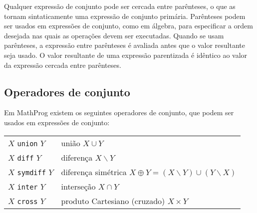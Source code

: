 \documentclass[11pt, brazil]{report}
\begin{document}
Qualquer expressão de conjunto pode ser cercada entre parênteses, o que as tornam
\linebreak sintaticamente uma expressão de conjunto primária.
Parênteses podem ser usados em expressões de conjunto, como em álgebra, para
especificar a ordem desejada nas quais as operações devem ser executadas.
Quando se usam parênteses, a expressão entre parênteses é avaliada
antes que o valor resultante seja usado.
O valor resultante de uma expressão parentizada é idêntico ao valor da expressão
cercada entre parênteses.

%
%

\newpage

\subsection{Operadores de conjunto}

Em MathProg existem os seguintes operadores de conjunto, que podem ser
usados em expressões de conjunto:


\begin{tabular}{@{}ll@{}}
$X$ {\tt union} $Y$&união $X\cup Y$\\
$X$ {\tt diff} $Y$&diferença $X\backslash Y$\\
$X$ {\tt symdiff} $Y$&diferença simétrica
$X\oplus Y=(X\backslash Y)\cup(Y\backslash X)$\\
$X$ {\tt inter} $Y$&interseção $X\cap Y$\\
$X$ {\tt cross} $Y$&produto Cartesiano (cruzado) $X\times Y$\\
\end{tabular}

\end{document}
